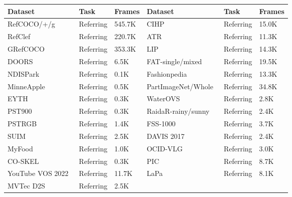\begin{table}[htbp]
  \centering
  \small
  \setlength{\tabcolsep}{3pt}
  \renewcommand{\arraystretch}{0.88}
  \begin{tabular}{p{}|p{}|p{}||p{}|p{}|p{}}
    \toprule
    Dataset & Task & Frames & Dataset & Task & Frames \\
    \midrule
    RefCOCO/+/g~\cite{KazemzadehOrdonezMattenBergEMNLP14} & Referring & 545.7K
    & CIHP~\cite{gong2018instance} & Referring & 15.0K \\
    RefClef~\cite{liao2020realtimecrossmodalitycorrelationfiltering} & Referring & 220.7K
    & ATR~\cite{CO-CNN} & Referring & 11.3K \\
    GRefCOCO~\cite{GRES} & Referring & 353.3K
    & LIP~\cite{Gong_2017_CVPR} & Referring & 14.3K \\
    DOORS~\cite{article} & Referring & 6.5K
    & FAT-single/mixed \cite{tremblay2018falling}& Referring & 19.5K \\
    NDISPark~\cite{visapp21} & Referring & 0.1K
    & Fashionpedia \cite{jia2020fashionpedia}& Referring & 13.3K \\
    MinneApple~\cite{Hani_2020} & Referring & 0.5K
    & PartImageNet/Whole~\cite{he2021partimagenet} & Referring & 34.8K \\
    EYTH~\cite{Urooj_2018_CVPR} & Referring & 0.3K
    & WaterOVS~\cite{waterovs_huggingface} & Referring & 2.8K \\
    PST900~\cite{shivakumar2019pst900} & Referring & 0.3K
    & RaidaR-rainy/sunny~\cite{jin2021raidarrichannotatedimage} & Referring & 2.4K \\
    PSTRGB~\cite{Shivakumar2019PST900RC} & Referring & 1.4K
    & FSS-1000~\cite{Li_2020} & Referring & 3.7K \\
    SUIM~\cite{islam2020suim} & Referring & 2.5K
    & DAVIS 2017 \cite{Caelles_arXiv_2019} & Referring & 2.4K \\
    MyFood~\cite{aicrowd_food_recognition_challenge} & Referring & 1.0K
    & OCID-VLG \cite{tziafas2023language} & Referring & 3.0K \\
    CO-SKEL~\cite{8099896}& Referring & 0.3K
    & PIC \cite{liu2022pic}& Referring & 8.7K \\
    YouTube VOS 2022~\cite{xu2018youtubevoslargescalevideoobject} & Referring & 11.7K
    & LaPa \cite{liu2020new}& Referring & 8.1K \\
    MVTec D2S~\cite{10.1007/978-3-030-01249-6_35} & Referring & 2.5K

\end{tabular}
\end{table}
